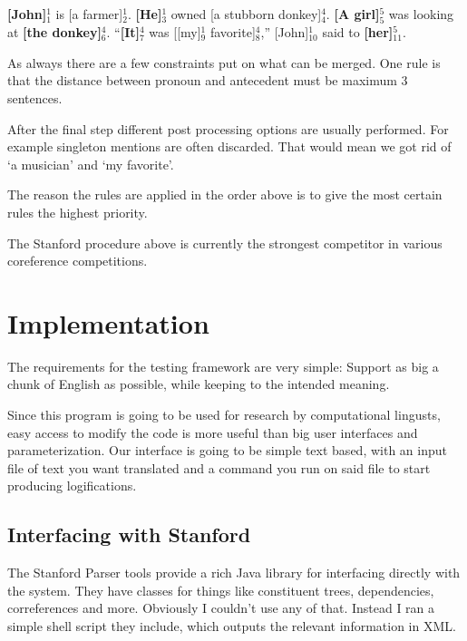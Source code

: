 \documentclass[12pt]{article}
\let\stdsection\section
\renewcommand\section{\newpage\stdsection}
\begin{document}
\begin{description}
\textbf{[John]$_1^1$} is [a farmer]$_2^1$. \textbf{[He]$_3^1$} owned [a stubborn donkey]$_4^4$.\newline
\textbf{[A girl]$_5^5$} was looking at \textbf{[the donkey]$_6^4$}.\newline
``\textbf{[It]$_7^4$} was [[my]$_9^1$ favorite]$_8^4$,'' [John]$_{10}^1$ said to \textbf{[her]$_{11}^{5}$}.

As always there are a few constraints put on what can be merged. One rule is that the distance between pronoun and antecedent must be maximum 3 sentences.
\end{description}

After the final step different post processing options are usually performed. For example singleton mentions are often discarded. That would mean we got rid of `a musician' and `my favorite'.

The reason the rules are applied in the order above is to give the most certain rules the highest priority.

The Stanford procedure above is currently the strongest competitor in various coreference competitions.\cite{lee2011stanford}\cite{raghunathan2010multi}

\section{Implementation}

The requirements for the testing framework are very simple: Support as big a chunk of English as possible, while keeping to the intended meaning.

Since this program is going to be used for research by computational lingusts, easy access to modify the code is more useful than big user interfaces and parameterization. Our interface is going to be simple text based, with an input file of text you want translated and a command you run on said file to start producing logifications.

\subsection{Interfacing with Stanford}

The Stanford Parser tools provide a rich Java library for interfacing directly with the system. They have classes for things like constituent trees, dependencies, correferences and more. Obviously I couldn't use any of that. Instead I ran a simple shell script they include, which outputs the relevant information in XML.
\end{document}
